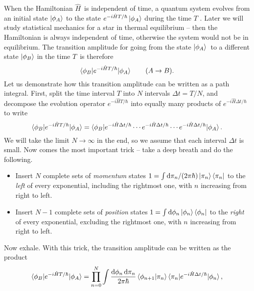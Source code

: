 When the Hamiltonian $\hat{H}$ is independent of time, a quantum system evolves from an initial state $\ket{\phi_A}$ to the state $e^{-i \hat{H} T / \hbar} \ket{\phi_A}$ during the time $T$ \cite[equation 2.28]{ref:sakurai}.
Later we will study statistical mechanics for a star in thermal equilibrium -- then the Hamiltonian is always independent of time, otherwise the system would not be in equilibrium.
The transition amplitude for going from the state $\ket{\phi_A}$ to a different state $\ket{\phi_B}$ in the time $T$ is therefore
\begin{equation}
	\braket{\phi_B | e^{- i \hat{H} T / \hbar} | \phi_A} \qquad (A \rightarrow B) .
	\label{eq:tft:transition_amplitude_intro}
\end{equation}
Let us demonstrate how this transition amplitude can be written as a path integral.
First, split the time interval $T$ into $N$ intervals $\Delta t = T / N$, and decompose the evolution operator $e^{- i \hat{H} T / \hbar}$ into equally many products of $e^{- i \hat{H} \Delta t / \hbar}$ to write
\newcommand\pointarrow[1]{\underset{\underset{\displaystyle #1}{\displaystyle \uparrow}}{}}
\begin{equation}
	\braket{\phi_B | e^{- i \hat{H} T / \hbar} | \phi_A} = \braket{\phi_B | e^{- i \hat{H} \Delta t / \hbar} \cdots e^{- i \hat{H} \Delta t / \hbar} \cdots e^{- i \hat{H} \Delta t / \hbar} | \phi_A} .
\end{equation}
We will take the limit $N \rightarrow \infty$ in the end, so we assume that each interval $\Delta t$ is small.
Now comes the most important trick -- take a deep breath and do the following.
\begin{itemize}
\item Insert $N$ complete sets of \emph{momentum} states $1 = \int \mathop{}\!\mathrm{d} \pi_n / (2 \pi \hbar) \ket{\pi_n} \bra{\pi_n}$ to the \emph{left} of every exponential, including the rightmost one, with $n$ increasing from right to left.
\item Insert $N-1$ complete sets of \emph{position} states $1 = \int \mathop{}\!\mathrm{d} \phi_n \ket{\phi_n} \bra{\phi_n}$ to the \emph{right} of every exponential, excluding the rightmost one, with $n$ increasing from right to left.
\end{itemize}
Now exhale.
With this trick, the transition amplitude can be written as the product
\begin{equation}
	\braket{\phi_B | e^{- i \hat{H} T / \hbar} | \phi_A} = \prod_{n=0}^{N} \int \frac{\mathop{}\!\mathrm{d} \phi_n \mathop{}\!\mathrm{d} \pi_n}{2 \pi \hbar} 
	             \braket{\phi_{n+1} | \pi_n} \braket{\pi_n | e^{- i \hat{H} \Delta t / \hbar} | \phi_n} ,
\label{eq:tft:transition_amplitude_product}
\end{equation}
